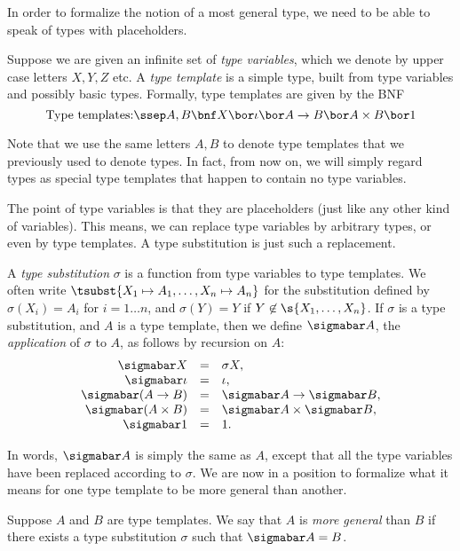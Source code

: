 \documentclass[12pt]{article}
\begin{document}
In order to formalize the notion of a most general type, we need to be
able to speak of types with placeholders. 

\begin{definition}
  Suppose we are given an
  infinite set of {\em type variables}, which we denote by upper case
  letters $X,Y,Z$ etc. A {\em type template} is a simple type, built
  from type variables and possibly basic types. Formally, type templates
  are given by the BNF
  \[ \mbox{Type templates:}\ssep A,B \bnf X \bor \iota \bor A\to B\bor 
  A\times B\bor 1
  \]
\end{definition}

Note that we use the same letters $A,B$ to denote type templates that
we previously used to denote types. In fact, from now on, we will
simply regard types as special type templates that happen to contain
no type variables.

The point of type variables is that they are placeholders (just like
any other kind of variables). This means, we can replace type
variables by arbitrary types, or even by type templates. A type
substitution is just such a replacement.

\begin{definition}
  A {\em type substitution} $\sigma$ is a function from type variables
  to type templates. We often write $\tsubst{X_1\mapsto A_1,\ldots,X_n\mapsto
  A_n}$ for the substitution defined by $\sigma(X_i)=A_i$ for
  $i=1\ldots n$, and $\sigma(Y)=Y$ if $Y\not\in\s{X_1,\ldots,X_n}$. 
  If $\sigma$ is a type substitution, and $A$ is a type template, then
  we define $\sigmabar A$, the {\em application} of $\sigma$ to $A$,
  as follows by recursion on $A$:
  \[ \begin{array}{rcl}
    \sigmabar X &=& \sigma X, \\
    \sigmabar \iota &=& \iota, \\
    \sigmabar (A\to B) &=& \sigmabar A \to \sigmabar B, \\
    \sigmabar (A\times B) &=& \sigmabar A \times \sigmabar B, \\
    \sigmabar 1 &=& 1.
  \end{array}
  \]
\end{definition}

In words, $\sigmabar A$ is simply the same as $A$, except that all the
type variables have been replaced according to $\sigma$. We are now in
a position to formalize what it means for one type template to be more
general than another.

\begin{definition}
  Suppose $A$ and $B$ are type templates. We say that $A$ is {\em more
    general} than $B$ if there exists a type substitution $\sigma$
  such that $\sigmabar A=B$.
\end{definition}
\end{document}
